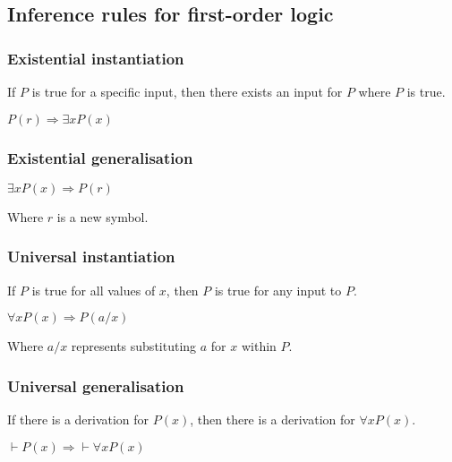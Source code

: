 
\subsection{Inference rules  for first-order logic}

\subsubsection{Existential instantiation}

If \(P\) is true for a specific input, then there exists an input for \(P\) where \(P\) is true.

$P(r)\Rightarrow \exists xP(x)$

\subsubsection{Existential generalisation}

$\exists xP(x)\Rightarrow P(r)$

Where \(r\) is a new symbol.

\subsubsection{Universal instantiation}

If \(P\) is true for all values of \(x\), then \(P\) is true for any input to \(P\).

$\forall xP(x)\Rightarrow P(a/x)$

Where \(a / x\) represents substituting \(a\) for \(x\) within \(P\).

\subsubsection{Universal generalisation}

If there is a derivation for \(P(x)\), then there is a derivation for \(\forall x P(x)\).

$\vdash P(x)\Rightarrow \vdash \forall x P(x)$

